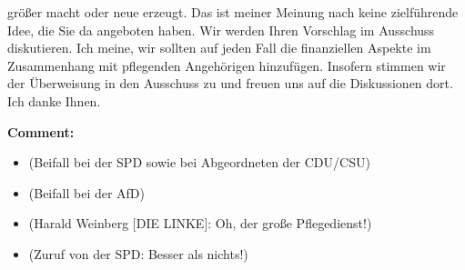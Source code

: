 \documentclass{article}
\begin{document}
größer macht oder neue erzeugt. Das ist meiner Meinung nach keine zielführende Idee, die Sie da angeboten haben. Wir werden Ihren Vorschlag im Ausschuss diskutieren. Ich meine, wir sollten auf jeden Fall die finanziellen Aspekte im Zusammenhang mit pflegenden Angehörigen hinzufügen. Insofern stimmen wir der Überweisung in den Ausschuss zu und freuen uns auf die Diskussionen dort. Ich danke Ihnen.  

\noindent\textbf{Comment:}
\begin{itemize}
    \setlength\itemsep{-3pt}
    \item (Beifall bei der SPD sowie bei Abgeordneten der CDU/CSU)
    \setlength\itemsep{-3pt}
    \item (Beifall bei der AfD)
    \setlength\itemsep{-3pt}
    \item (Harald Weinberg [DIE LINKE]: Oh, der große Pflegedienst!)
    \setlength\itemsep{-3pt}
    \item (Zuruf von der SPD: Besser als nichts!)
\end{itemize}
\end{document}
